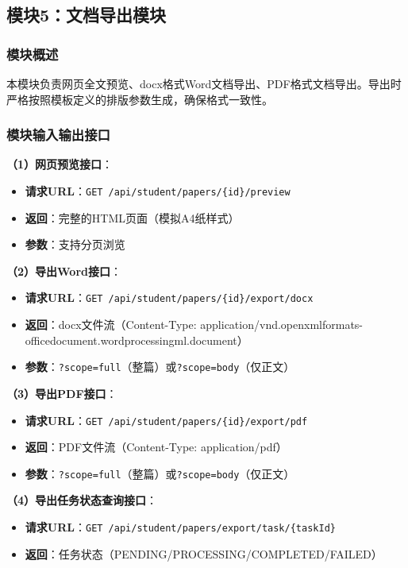 \documentclass{../template/softeng}
\begin{document}
	\subsection{模块5：文档导出模块}

	\subsubsection{模块概述}
	本模块负责网页全文预览、docx格式Word文档导出、PDF格式文档导出。导出时严格按照模板定义的排版参数生成，确保格式一致性。

	\subsubsection{模块输入输出接口}

	\textbf{（1）网页预览接口}：
	\begin{itemize}
		\item \textbf{请求URL}：\texttt{GET /api/student/papers/\{id\}/preview}
		\item \textbf{返回}：完整的HTML页面（模拟A4纸样式）
		\item \textbf{参数}：支持分页浏览
	\end{itemize}

	\textbf{（2）导出Word接口}：
	\begin{itemize}
		\item \textbf{请求URL}：\texttt{GET /api/student/papers/\{id\}/export/docx}
		\item \textbf{返回}：docx文件流（Content-Type: application/vnd.openxmlformats-officedocument.wordprocessingml.document）
		\item \textbf{参数}：\texttt{?scope=full}（整篇）或\texttt{?scope=body}（仅正文）
	\end{itemize}

	\textbf{（3）导出PDF接口}：
	\begin{itemize}
		\item \textbf{请求URL}：\texttt{GET /api/student/papers/\{id\}/export/pdf}
		\item \textbf{返回}：PDF文件流（Content-Type: application/pdf）
		\item \textbf{参数}：\texttt{?scope=full}（整篇）或\texttt{?scope=body}（仅正文）
	\end{itemize}

	\textbf{（4）导出任务状态查询接口}：
	\begin{itemize}
		\item \textbf{请求URL}：\texttt{GET /api/student/papers/export/task/\{taskId\}}
		\item \textbf{返回}：任务状态（PENDING/PROCESSING/COMPLETED/FAILED）
	\end{itemize}
\end{document}
